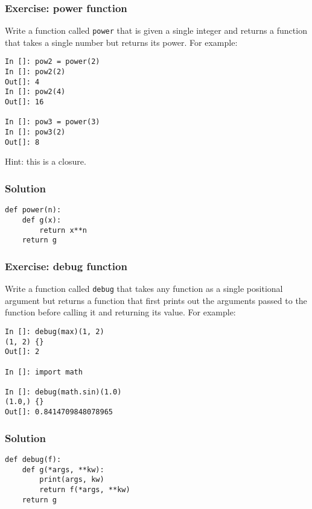 \documentclass[14pt,compress]{beamer}
\begin{document}
\begin{frame}
  \frametitle{Exercise: power function}
  \begin{block}{}
    Write a function called \lstinline{power} that is given a single integer
    and returns a function that takes a single number but returns its power.
    For example:
  \end{block}

\begin{lstlisting}
In []: pow2 = power(2)
In []: pow2(2)
Out[]: 4
In []: pow2(4)
Out[]: 16

In []: pow3 = power(3)
In []: pow3(2)
Out[]: 8
\end{lstlisting}
  Hint: this is a closure.
\end{frame}


\begin{frame}
  \frametitle{Solution}
\begin{lstlisting}
def power(n):
    def g(x):
        return x**n
    return g

\end{lstlisting}
\end{frame}


\begin{frame}
  \frametitle{Exercise: debug function}
  \begin{block}{}
    Write a function called \lstinline{debug} that takes any function as a
    single positional argument but returns a function that first prints out
    the arguments passed to the function before calling it and returning its
    value. For example:
  \end{block}

\begin{lstlisting}
In []: debug(max)(1, 2)
(1, 2) {}
Out[]: 2

In []: import math

In []: debug(math.sin)(1.0)
(1.0,) {}
Out[]: 0.8414709848078965

\end{lstlisting}
\end{frame}


\begin{frame}
  \frametitle{Solution}
\begin{lstlisting}
def debug(f):
    def g(*args, **kw):
        print(args, kw)
        return f(*args, **kw)
    return g
\end{lstlisting}
\end{frame}
\end{document}
